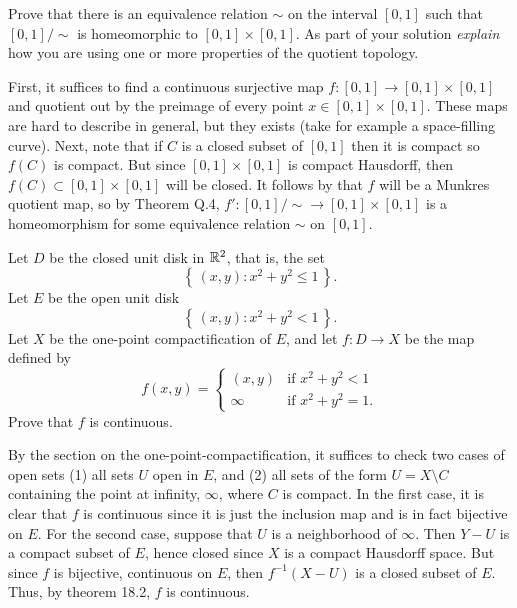 \begin{problem}
  Prove that there is an equivalence relation $\sim$ on the interval
  $[0,1]$ such that $[0,1]/{\sim}$ is homeomorphic to
  $[0,1]\times[0,1]$. As part of your solution \emph{explain} how you are
  using one or more properties of the quotient topology.
\end{problem}
\begin{solution}
  First, it suffices to find a continuous surjective map
  $f\colon[0,1]\to [0,1]\times[0,1]$ and quotient out by the preimage of
  every point $x\in[0,1]\times[0,1]$. These maps are hard to describe in
  general, but they exists (take for example a space-filling curve). Next,
  note that if $C$ is a closed subset of $[0,1]$ then it is compact so
  $f(C)$ is compact. But since $[0,1]\times[0,1]$ is compact Hausdorff,
  then $f(C)\subset[0,1]\times[0,1]$ will be closed. It follows by that $f$
  will be a Munkres quotient map, so by Theorem Q.4,
  $f'\colon [0,1]/{\sim}\to[0,1]\times[0,1]$ is a homeomorphism for some
  equivalence relation $\sim$ on $[0,1]$.
\end{solution}

\begin{problem}
  Let $D$ be the closed unit disk in $\mathbb{R}^2$, that is, the set
  \[
    \left\{\,(x,y):x^2+y^2\leq 1\,\right\}.
  \]
  Let $E$ be the open unit disk
  \[
    \left\{\,(x,y):x^2+y^2<1\,\right\}.
  \]
  Let $X$ be the one-point compactification of $E$, and let
  $f\colon D\to X$ be the map defined by
  \[
    f(x,y)=
    \begin{cases}
      (x,y)&\text{if $x^2+y^2<1$}\\
      \infty&\text{if $x^2+y^2=1$.}
    \end{cases}
  \]
  Prove that $f$ is continuous.
\end{problem}
\begin{solution}
  By the section on the one-point-compactification, it suffices to check
  two cases of open sets (1) all sets $U$ open in $E$, and (2) all sets of
  the form $U=X\setminus C$ containing the point at infinity,
  $\infty$, where $C$ is compact. In the first case, it is clear that $f$
  is continuous since it is just the inclusion map and is in fact bijective
  on $E$. For the second case, suppose that $U$ is a neighborhood of
  $\infty$. Then $Y-U$ is a compact subset of $E$, hence closed since $X$
  is a compact Hausdorff space. But since $f$ is bijective, continuous on
  $E$, then $f^{-1}(X-U)$ is a closed subset of $E$. Thus, by theorem 18.2,
  $f$ is continuous.
\end{solution}

